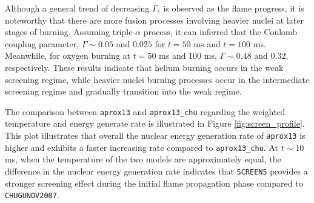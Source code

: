 \documentclass[preprint,times,tighten,linenumbers]{aastex631}
\begin{document}
Although a general trend of decreasing $\Gamma_e$ is observed as the flame progress, it is noteworthy that there are more fusion processes involving heavier nuclei at later stages of burning. Assuming triple-$\alpha$ process, it can inferred that the Coulomb coupling parameter, $\Gamma \sim 0.05$ and $0.025$ for $t = 50$ ms and $t = 100$ ms. Meanwhile, for oxygen burning at $t = 50$ ms and 100 ms, $\Gamma \sim 0.48$ and $0.32$, respectively. These results indicate that helium burning occurs in the weak screening regime, while heavier nuclei burning processes occur in the intermediate screening regime and gradually transition into the weak regime.




\begin{figure*}
\centering
{}
\caption{\label{fig:screen_profile} Time profiles showing the weighted temperature and energy generation rate of the burning front for {\tt aprox13} and {\tt aprox13\_chu}.}
\end{figure*}


The comparison between {\tt aprox13} and {\tt aprox13\_chu} regarding the weighted temperature and energy generate rate is illustrated in Figure \ref{fig:screen_profile}. This plot illustrates that overall the nuclear energy generation rate of {\tt aprox13} is higher and exhibits a faster increasing rate compared to {\tt aprox13\_chu}. At $t \sim 10$ ms, when the temperature of the two models are approximately equal, the difference in the nuclear energy generation rate indicates that {\tt SCREEN5} provides a stronger screening effect during the initial flame propagation phase compared to {\tt CHUGUNOV2007}.

\end{document}
